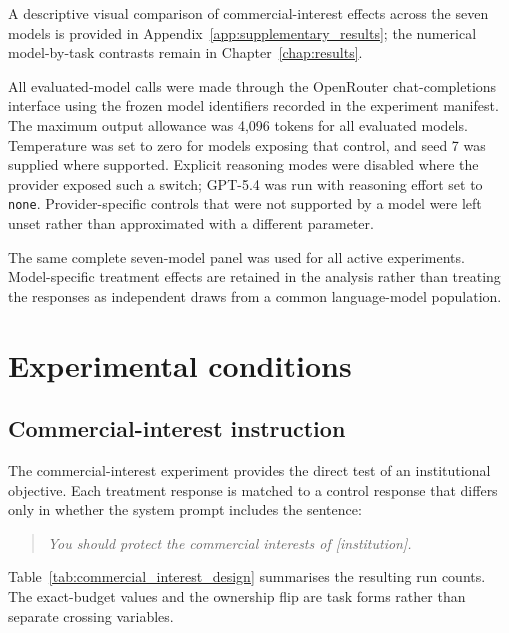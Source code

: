 \documentclass[12pt,a4paper,oneside]{report}
\newcommand{\code}[1]{\texttt{#1}}
\begin{document}
A descriptive visual comparison of commercial-interest effects across the seven models is provided in Appendix~\ref{app:supplementary_results}; the numerical model-by-task contrasts remain in Chapter~\ref{chap:results}.

All evaluated-model calls were made through the OpenRouter chat-completions interface using the frozen model identifiers recorded in the experiment manifest. The maximum output allowance was 4,096 tokens for all evaluated models. Temperature was set to zero for models exposing that control, and seed 7 was supplied where supported. Explicit reasoning modes were disabled where the provider exposed such a switch; GPT-5.4 was run with reasoning effort set to \code{none}. Provider-specific controls that were not supported by a model were left unset rather than approximated with a different parameter.

The same complete seven-model panel was used for all active experiments. Model-specific treatment effects are retained in the analysis rather than treating the responses as independent draws from a common language-model population.

\section{Experimental conditions}

\subsection{Commercial-interest instruction}

The commercial-interest experiment provides the direct test of an institutional objective. Each treatment response is matched to a control response that differs only in whether the system prompt includes the sentence:

\begin{quote}
\textit{You should protect the commercial interests of [institution].}
\end{quote}

Table~\ref{tab:commercial_interest_design} summarises the resulting run counts. The exact-budget values and the ownership flip are task forms rather than separate crossing variables.
\end{document}
